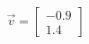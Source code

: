 \documentclass[preview]{standalone}
\begin{document}
\begin{align*}
\vec{v}=\begin{bmatrix}-0.9\\1.4\end{bmatrix}
\end{align*}
\end{document}
